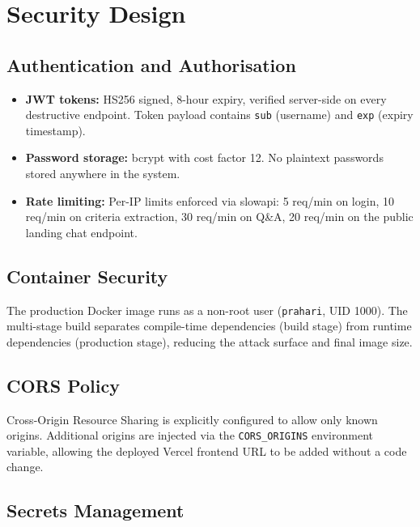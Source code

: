 \documentclass[12pt,a4paper]{article}
\begin{document}
\section{Security Design}

\subsection{Authentication and Authorisation}

\begin{itemize}
\item \textbf{JWT tokens:} HS256 signed, 8-hour expiry, verified server-side on
    every destructive endpoint. Token payload contains \texttt{sub} (username)
    and \texttt{exp} (expiry timestamp).
\item \textbf{Password storage:} bcrypt with cost factor 12. No plaintext passwords
    stored anywhere in the system.
\item \textbf{Rate limiting:} Per-IP limits enforced via slowapi:
    5 req/min on login, 10 req/min on criteria extraction,
    30 req/min on Q\&A, 20 req/min on the public landing chat endpoint.
\end{itemize}

\subsection{Container Security}

The production Docker image runs as a non-root user (\texttt{prahari}, UID 1000).
The multi-stage build separates compile-time dependencies (build stage) from
runtime dependencies (production stage), reducing the attack surface and final
image size.

\subsection{CORS Policy}

Cross-Origin Resource Sharing is explicitly configured to allow only known origins.
Additional origins are injected via the \texttt{CORS\_ORIGINS} environment variable,
allowing the deployed Vercel frontend URL to be added without a code change.

\subsection{Secrets Management}
\end{document}

